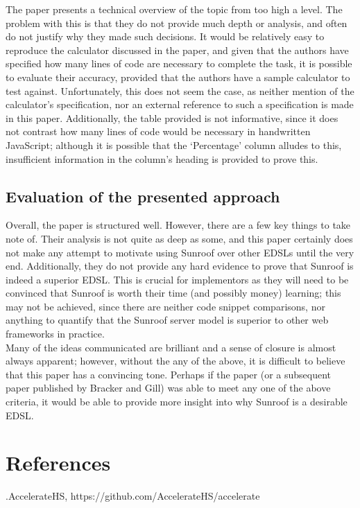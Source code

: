 \documentclass[9pt]{report}
\begin{document}
The paper presents a technical overview of the topic from too high a level.
The problem with this is that they do not provide much depth or analysis, and often do not justify why they made such decisions.
It would be relatively easy to reproduce the calculator discussed in the paper, and given that the authors have specified how many lines of code are necessary to complete the task, it is possible to evaluate their accuracy, provided that the authors have a sample calculator to test against.
Unfortunately, this does not seem the case, as neither mention of the calculator's specification, nor an external reference to such a specification is made in this paper.
Additionally, the table provided is not informative, since it does not contrast how many lines of code would be necessary in handwritten JavaScript; although it is possible that the `Percentage' column alludes to this, insufficient information in the column's heading is provided to prove this.

\subsection*{Evaluation of the presented approach}
Overall, the paper is structured well.
However, there are a few key things to take note of.
Their analysis is not quite as deep as some, and this paper certainly does not make any attempt to motivate using Sunroof over other EDSLs until the very end.
Additionally, they do not provide any hard evidence to prove that Sunroof is indeed a superior EDSL.
This is crucial for implementors as they will need to be convinced that Sunroof is worth their time (and possibly money) learning; this may not be achieved, since there are neither code snippet comparisons, nor anything to quantify that the Sunroof server model is superior to other web frameworks in practice.\\

Many of the ideas communicated are brilliant and a sense of closure is almost always apparent; however, without the any of the above, it is difficult to believe that this paper has a convincing tone.
Perhaps if the paper (or a subsequent paper published by Bracker and Gill) was able to meet any one of the above criteria, it would be able to provide more insight into why Sunroof is a desirable EDSL.

\section*{References}
.\hspace{5mm}AccelerateHS, https://github.com/AccelerateHS/accelerate\\
\end{document}
